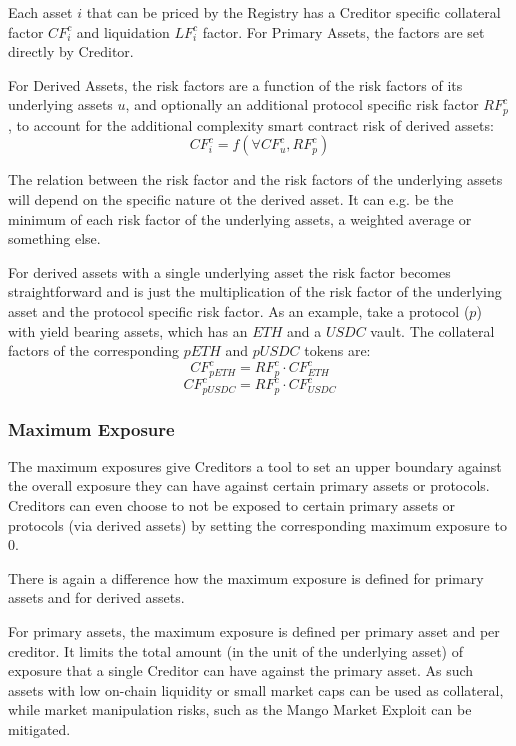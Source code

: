 \documentclass[sigconf,nonacm]{acmart}
\begin{document}
Each asset $i$ that can be priced by the Registry has a Creditor specific collateral factor $CF_{i}^{c}$ and liquidation $LF_{i}^{c}$ factor.
For Primary Assets, the factors are set directly by Creditor.

For Derived Assets, the risk factors are a function of the risk factors of its underlying assets $u$, and optionally an additional protocol specific risk factor $RF_{p}^{c}$,
to account for the additional complexity smart contract risk of derived assets:
\begin{equation}
    CF_{i}^{c} = f(\forall CF_{u}^{c}, RF_{p}^{c})
\end{equation}

The relation between the risk factor and the risk factors of the underlying assets will depend on the specific nature ot the derived asset.
It can e.g. be the minimum of each risk factor of the underlying assets, a weighted average or something else.

For derived assets with a single underlying asset the risk factor becomes straightforward and is just the multiplication of the risk factor of the underlying asset and the protocol specific risk factor.
As an example, take a protocol ($p$) with yield bearing assets, which has an $ETH$ and a $USDC$ vault.
The collateral factors of the corresponding $pETH$ and $pUSDC$ tokens are:
\begin{equation}
    CF_{pETH}^{c} = RF_{p}^{c} \cdot CF_{ETH}^{c}
\end{equation}
\begin{equation}
    CF_{pUSDC}^{c} = RF_{p}^{c} \cdot CF_{USDC}^{c}
\end{equation}

\subsubsection{Maximum Exposure}
The maximum exposures give Creditors a tool to set an upper boundary against the overall exposure they can have against certain primary assets or protocols.
Creditors can even choose to not be exposed to certain primary assets or protocols (via derived assets) by setting the corresponding maximum exposure to 0.

There is again a difference how the maximum exposure is defined for primary assets and for derived assets.

For primary assets, the maximum exposure is defined per primary asset and per creditor.
It limits the total amount (in the unit of the underlying asset) of exposure that a single Creditor can have against the primary asset.
As such assets with low on-chain liquidity or small market caps can be used as collateral,
while market manipulation risks, such as the Mango Market Exploit\cite{coindeskDeFiExchange} can be mitigated.
\end{document}
